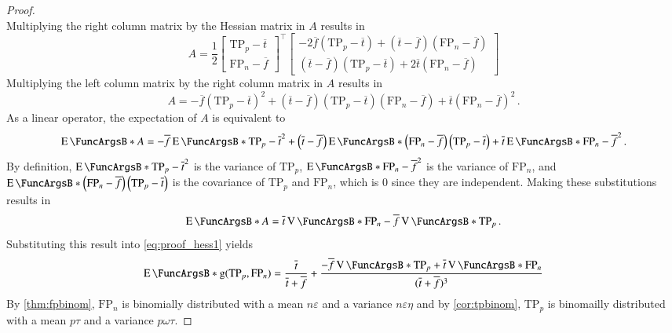 \documentclass[10pt,final,hidelinks]{article}
\numberwithin{equation}{section}
\newcommand{\TP}{\RV{TP}}
\newcommand{\FP}{\RV{FP}}
\newcommand{\tprate}{\tau}
\newcommand{\fprate}{\varepsilon}
\newcommand{\fnrate}{\omega}
\newcommand{\tnrate}{\eta}
\newcommand{\RV}[1]{\mathrm{#1}}
\theoremstyle{plain}
\begin{document}
{\begin{proof}
\begin{equation}
\end{equation}
Multiplying the right column matrix by the Hessian matrix in $A$ results in
\begin{equation}
    A = \frac{1}{2}
    \begin{bmatrix}
        \TP_p - \overline{t}\\
        \FP_n - \overline{f}
    \end{bmatrix}^{\intercal}
    \begin{bmatrix}
        -2 \overline{f} \left(\TP_p - \overline{t}\right) + \left(\overline{t}-\overline{f}\right)\left(\FP_n - \overline{f}\right)\\
        \left(\overline{t}-\overline{f}\right)\left(\TP_p - \overline{t}\right) + 2 \overline{t}\left(\FP_n - \overline{f}\right)
    \end{bmatrix}
\end{equation}
Multiplying the left column matrix by the right column matrix in $A$ results in
\begin{equation}
    A = -\overline{f} \left(\TP_p - \overline{t}\right)^2 + 
    \left(\overline{t}-\overline{f}\right)\left(\TP_p - 
    \overline{t}\right)\left(\FP_n - \overline{f}\right) + 
    \overline{t}\left(\FP_n - \overline{f}\right)^2\,.
\end{equation}
As a linear operator, the expectation of $A$ is equivalent to
\begin{equation}
\label{eq:proof_of_exp_precision_approx_1}
    \Expect{A} = -\overline{f} \Expect{\TP_p - \overline{t}}^2 + \left(\overline{t}-\overline{f}\right)\Expect{\left(\FP_n - \overline{f}\right)\left(\TP_p - \overline{t}\right)} + \overline{t}\Expect{\FP_n - \overline{f}}^2\,.
\end{equation}
By definition, $\Expect{\TP_p - \overline{t}}^2$ is the variance of $\TP_p$, $\Expect{\FP_n - \overline{f}}^2$ is the variance of $\FP_n$, and $\Expect{\left(\FP_n - \overline{f}\right)\left(\TP_p - \overline{t}\right)}$ is the covariance of $\TP_p$ and $\FP_n$, which is $0$ since they are independent.
Making these substitutions results in
\begin{equation}
    \Expect{A} = \overline{t} \Var{\FP_n} - \overline{f} \Var{\TP_p}\,.
\end{equation}
Substituting this result into \cref{eq:proof_hess1} yields
\begin{equation}
\label{eq:proof_hess2}
    \Expect{\Fun{g}(\TP_p,\FP_n)} = 
    \frac{\overline{t}}{\overline{t}+\overline{f}} + 
    \frac{-\overline{f} \Var{\TP_p} + 
    \overline{t}\Var{\FP_n}}{(\overline{t} + \overline{f})^3}
\end{equation}
By \cref{thm:fpbinom}, $\FP_n$ is binomially distributed with a mean $n \fprate$ and a variance $n \fprate \tnrate$ and by \cref{cor:tpbinom}, $\TP_p$ is binomailly distributed with a mean $p \tprate$ and a variance $p \fnrate \tprate$.
\end{proof}

}
\end{document}
